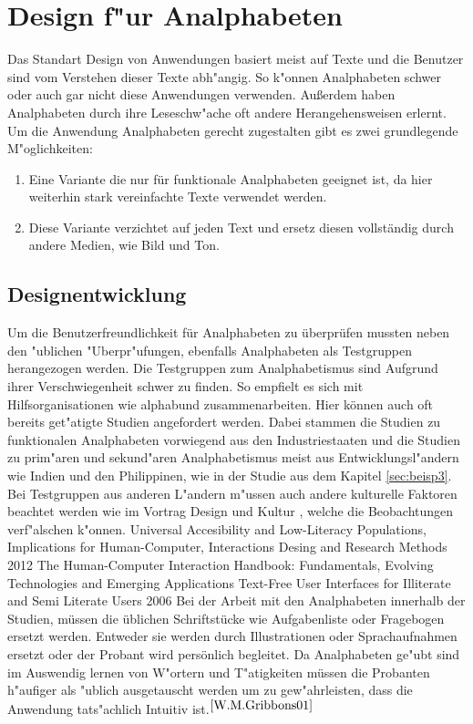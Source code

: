 \section{Design f"ur Analphabeten}
Das Standart Design von Anwendungen basiert meist auf Texte und die Benutzer sind vom Verstehen dieser Texte abh"angig. So  k"onnen Analphabeten schwer oder auch gar nicht diese Anwendungen verwenden. Außerdem haben Analphabeten durch ihre Leseschw"ache oft andere Herangehensweisen erlernt.\\
Um die Anwendung Analphabeten gerecht zugestalten gibt es zwei grundlegende M"oglichkeiten:
\begin{enumerate}
	\item Eine Variante die nur für funktionale Analphabeten geeignet ist, da hier weiterhin stark vereinfachte Texte verwendet werden.
	\item Diese Variante verzichtet auf jeden Text und ersetz diesen vollständig durch andere Medien, wie Bild und Ton.
\end{enumerate}

\subsection{Designentwicklung}\label{sec:designEval}
Um die Benutzerfreundlichkeit für Analphabeten zu überprüfen mussten neben den "ublichen "Uberpr"ufungen, ebenfalls Analphabeten als Testgruppen herangezogen werden. Die Testgruppen zum Analphabetismus sind Aufgrund ihrer Verschwiegenheit schwer zu finden. So empfielt es sich mit  Hilfsorganisationen wie \glqq alphabund \grqq zusammenarbeiten. Hier können auch oft bereits get"atigte Studien angefordert werden. Dabei stammen die Studien zu funktionalen Analphabeten vorwiegend aus den Industriestaaten und die Studien zu prim"aren und sekund"aren Analphabetismus meist aus Entwicklungsl"andern wie Indien und den Philippinen,  wie in der Studie aus dem Kapitel \ref{sec:beisp3}. Bei Testgruppen aus anderen L"andern m"ussen auch andere kulturelle Faktoren beachtet werden wie im Vortrag \glqq Design und Kultur \grqq, welche die Beobachtungen verf"alschen k"onnen.  
					{Universal Accesibility and Low-Literacy Populations, Implications for Human-Computer, Interactions Desing and Research Methods}
					{2012}
					{The Human-Computer Interaction Handbook: Fundamentals, Evolving Technologies and Emerging Applications}
					{Text-Free User Interfaces for Illiterate and Semi Literate Users}
					{2006}{}
Bei der Arbeit mit den Analphabeten innerhalb der Studien, müssen die üblichen Schriftstücke wie Aufgabenliste oder Fragebogen ersetzt werden. Entweder sie werden durch Illustrationen oder Sprachaufnahmen ersetzt oder der Probant wird persönlich begleitet.
Da Analphabeten ge"ubt sind im Auswendig lernen von W"ortern und T"atigkeiten müssen die Probanten h"aufiger als "ublich ausgetauscht werden um zu gew"ahrleisten, dass die Anwendung tats"achlich Intuitiv ist.$^{\ref{W.M.Gribbons01}}$\\

